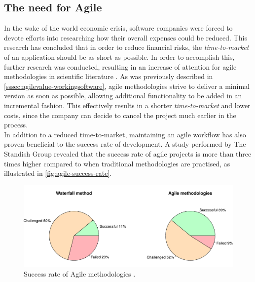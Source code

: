
\subsection{The need for Agile}
In the wake of the world economic crisis, software companies were forced to devote efforts into researching how their overall expenses could be reduced. This research has concluded that in order to reduce financial risks, the \emph{time-to-market} of an application should be as short as possible. In order to accomplish this, further research was conducted, resulting in an increase of attention for agile methodologies in scientific literature \cite{ionel2009}. As was previously described in \autoref{sssec:agilevalue-workingsoftware}, agile methodologies strive to deliver a minimal version as soon as possible, allowing additional functionality to be added in an incremental fashion. This effectively results in a shorter \emph{time-to-market} and lower costs, since the company can decide to cancel the project much earlier in the process.\\

\noindent In addition to a reduced time-to-market, maintaining an agile workflow has also proven beneficial to the success rate of development. A study performed by The Standish Group revealed that the success rate of agile projects is more than three times higher compared to when traditional methodologies are practised, as illustrated in \autoref{fig:agile-success-rate}. 

\begin{figure}[htbp!]
	\centering
	\includegraphics[width=\textwidth]{assets/agile-success-rate.pdf}
	\caption{Success rate of Agile methodologies \cite{standish2015chaos}.}
	\label{fig:agile-success-rate}
\end{figure}
